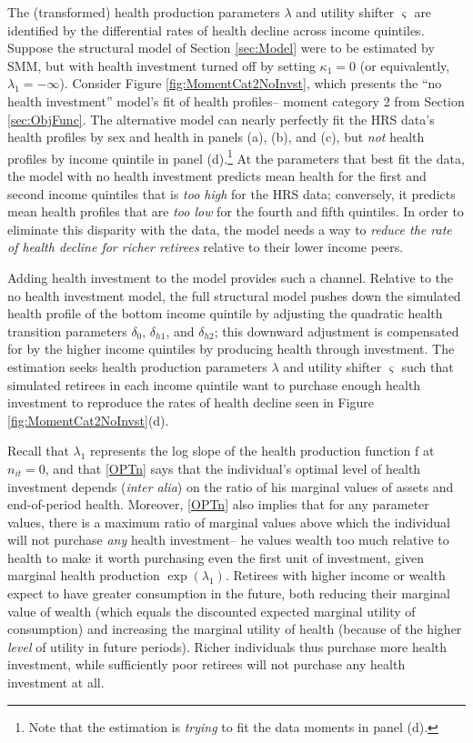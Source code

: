 \documentclass[12pt,pdftex,letterpaper]{article}
\newcommand{\Health}{h}
\newcommand{\Invst}{n}
\newcommand{\LifeUtility}{\varsigma}
\newcommand{\HealthParam}{\delta}
\newcommand{\HealthProdFunc}{\text{f}}
\newcommand{\HealthProdParam}{\kappa}
\newcommand{\HealthProdParamAlt}{\lambda}
\begin{document}
The (transformed) health production parameters $\HealthProdParamAlt$ and utility shifter $\LifeUtility$ are identified by the differential rates of health decline across income quintiles.  Suppose the structural model of Section \ref{sec:Model} were to be estimated by SMM, but with health investment turned off by setting $\HealthProdParam_1=0$ (or equivalently, $\HealthProdParamAlt_1 = -\infty$). Consider Figure \ref{fig:MomentCat2NoInvst}, which presents the ``no health investment'' model's fit of health profiles-- moment category 2 from Section \ref{sec:ObjFunc}.  The alternative model can nearly perfectly fit the HRS data's health profiles by sex and health in panels (a), (b), and (c), but \textit{not} health profiles by income quintile in panel (d).\footnote{Note that the estimation is \textit{trying} to fit the data moments in panel (d).}  At the parameters that best fit the data, the model with no health investment predicts mean health for the first and second income quintiles that is \textit{too high} for the HRS data; conversely, it predicts mean health profiles that are \textit{too low} for the fourth and fifth quintiles.  In order to eliminate this disparity with the data, the model needs a way to \textit{reduce the rate of health decline for richer retirees} relative to their lower income peers.

Adding health investment to the model provides such a channel.  Relative to the no health investment model, the full structural model pushes down the simulated health profile of the bottom income quintile by adjusting the quadratic health transition parameters $\HealthParam_0$, $\HealthParam_{\Health 1}$, and  $\HealthParam_{\Health 2}$; this downward adjustment is compensated for by the higher income quintiles by producing health through investment.  The estimation seeks health production parameters $\HealthProdParamAlt$ and utility shifter $\LifeUtility$ such that simulated retirees in each income quintile want to purchase enough health investment to reproduce the rates of health decline seen in Figure \ref{fig:MomentCat2NoInvst}(d).

Recall that $\HealthProdParamAlt_1$ represents the log slope of the health production function $\HealthProdFunc$ at $\Invst_{it}=0$, and that \eqref{OPTn} says that the individual's optimal level of health investment depends (\textit{inter alia}) on the ratio of his marginal values of assets and end-of-period health.  Moreover, \eqref{OPTn} also implies that for any parameter values, there is a maximum ratio of marginal values above which the individual will not purchase \textit{any} health investment-- he values wealth too much relative to health to make it worth purchasing even the first unit of investment, given marginal health production $\exp(\HealthProdParamAlt_1)$.  Retirees with higher income or wealth expect to have greater consumption in the future, both reducing their marginal value of wealth (which equals the discounted expected marginal utility of consumption) and increasing the marginal utility of health (because of the higher \textit{level} of utility in future periods).  Richer individuals thus purchase more health investment, while sufficiently poor retirees will not purchase any health investment at all.
\end{document}
